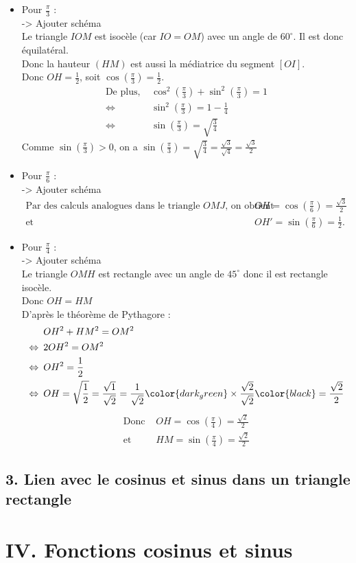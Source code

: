 \documentclass[11pt,a4paper]{article}
\begin{document}
\begin{itemize}
  \item Pour $\frac{\pi}{3}$ : \\ 
  -> Ajouter schéma \\
  Le triangle $IOM$ est isocèle (car $IO=OM$) avec un angle de $60^\circ$. Il est donc équilatéral. \\
  Donc la hauteur $(HM)$ est aussi la médiatrice du segment $[OI]$. \\
  Donc $OH=\frac{1}{2}$, soit $\cos{\left(\frac{\pi}{3}\right)}=\frac{1}{2}$.
  \begin{align*}
    \text{De plus, } &\cos^2{(\frac{\pi}{3})}+\sin^2{(\frac{\pi}{3})}=1\\
    \Leftrightarrow\,\,\,&\sin^2{(\frac{\pi}{3})}=1-\frac{1}{4} \\
    \Leftrightarrow\,\,\,&\sin{(\frac{\pi}{3})}=\sqrt{\frac{3}{4}}
  \end{align*}
  Comme $\sin{(\frac{\pi}{3})}>0$, on a $\sin{(\frac{\pi}{3})}=\sqrt{\frac{3}{4}}=\frac{\sqrt{3}}{\sqrt{4}}=\frac{\sqrt{3}}{2}$
  \item Pour $\frac{\pi}{6}$ : \\
  -> Ajouter schéma
  \begin{align*}
    \text{Par des calculs analogues dans le triangle $OMJ$, on obtient } &OH=\cos{(\frac{\pi}{6})}=\frac{\sqrt{3}}{2} \\
    \text{et } &OH'=\sin{(\frac{\pi}{6})}=\frac{1}{2}.
  \end{align*}
  \item Pour $\frac{\pi}{4}$ : \\
  -> Ajouter schéma \\
  Le triangle $OMH$ est rectangle avec un angle de $45^\circ$ donc il est rectangle isocèle. \\
  Donc $OH=HM$ \\
  D'après le théorème de Pythagore :
  \begin{align*}
    &OH^2+HM^2=OM^2 \\
    \Leftrightarrow \, \, \,&2OH^2=OM^2 \\
    \Leftrightarrow \, \, \,&OH^2=\frac{1}{2} \\
    \Leftrightarrow \, \, \,&OH=\sqrt{\frac{1}{2}}=\frac{\sqrt{1}}{\sqrt{2}} = \frac{1}{\sqrt{2}}\color{dark_green}\times\frac{\sqrt{2}}{\sqrt{2}}\color{black}=\frac{\sqrt{2}}{2}
  \end{align*}
  \begin{align*}
    \text{Donc } &OH=\cos{(\frac{\pi}{4})}=\frac{\sqrt{2}}{2} \\
    \text{et } &HM=\sin{(\frac{\pi}{4})}=\frac{\sqrt{2}}{2}
  \end{align*}
\end{itemize}

\subsection*{3. Lien avec le cosinus et sinus dans un triangle rectangle}

\section*{IV. Fonctions cosinus et sinus}
\end{document}
